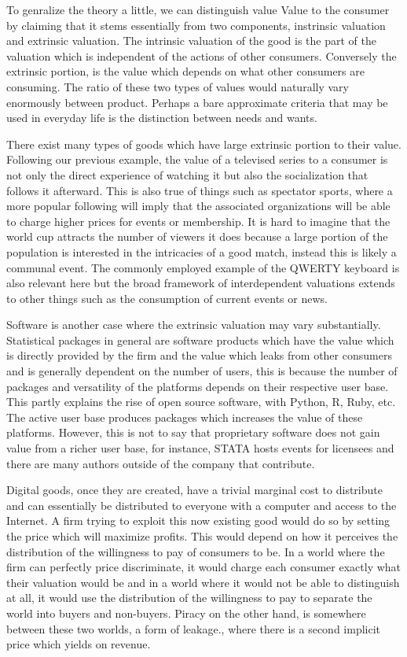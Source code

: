 \documentclass{article}
\begin{document}
To genralize the theory a little, we can distinguish value Value to the consumer by claiming that it stems essentially from two components, instrinsic valuation and extrinsic valuation. The intrinsic valuation of the good is the part of the valuation which is independent of the actions of other consumers. Conversely the extrinsic portion, is the value which depends on what other consumers are consuming. The ratio of these two types of values would naturally vary enormously between product. Perhaps a bare approximate criteria that may be used in everyday life is the distinction between needs and wants. 

There exist many types of goods which have large extrinsic portion to their value. Following our previous example, the value of a televised series to  a consumer is not only the direct experience of watching it but also the socialization that follows it afterward. This is also true of things such as spectator sports, where a more popular following will imply that the associated organizations will be able to charge higher prices for events or membership. It is hard to imagine that the world cup attracts the number of viewers it does because a large portion of the population is interested in the intricacies of a good match, instead this is likely a communal event. The commonly employed example of the QWERTY keyboard is also relevant here but the broad framework of interdependent valuations extends to other things such as the consumption of current events or news. 

Software is another case where the extrinsic valuation may vary substantially. Statistical packages in general are software products which have the value which is directly provided by the firm and the value which leaks from other consumers and is generally dependent on the number of users, this is because the number of packages and versatility of the platforms depends on their respective user base. This partly explains the rise of open source software, with Python, R, Ruby, etc.  The active user base produces packages which increases the value of these platforms. However, this is not to say that proprietary software does not gain value from a richer user base, for instance, STATA hosts events for licensees and there are many authors outside of the company that contribute.  

Digital goods, once they are created, have a trivial marginal cost to distribute and can essentially be distributed to everyone with a computer and access to the Internet. A firm trying to exploit this now existing good would do so by setting the price which will maximize profits. This would depend on how it perceives the distribution of the willingness to pay of consumers to be. In a world where the firm can perfectly price discriminate, it would charge each consumer exactly what their valuation would be and in a world where it would not be able to distinguish at all, it would use the distribution of the willingness to pay to separate the world into buyers and non-buyers. Piracy on the other hand, is somewhere between these two worlds, a form of leakage., where there is a second implicit price which yields on revenue. 
\end{document}
